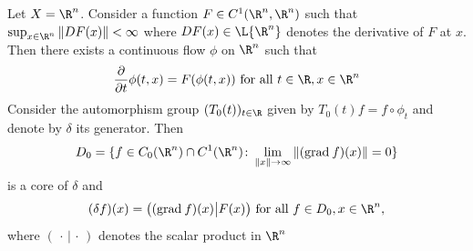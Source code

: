 \begin{example}\label{ex:b2-3.15}
Let $X = \R^{n}$.
Consider a function $F \in C^{1}(\R^{n},\R^{n})$ such that $\sup_{x \in \R^{n}} \|DF(x)\| < \infty$ where $DF(x) \in \L{\R^{n}}$ denotes the derivative of\/ $F$ at $x$.
Then there exists a continuous flow $\phi$ on $\R^{n}$ such that
\begin{equation}\label{eq:b2-3.20}
\frac{\partial}{\partial t} \phi(t,x) = F(\phi(t,x)) \text{ for all } t \in \R, x \in \R^{n}
\end{equation}
Consider the automorphism group $(T_{0}(t))_{t \in \R}$ given by $T_{0}(t)f = f \circ \phi_{t}$
and denote by $\delta$ its generator.
Then 
\[D_{0} = \{ f \in C_{0}(\R^{n}) \cap C^{1}(\R^{n}) \colon \lim_{\|x\| \to \infty} \|(\mathrm{grad}\: f)(x)\| = 0 \}
\]
is a core of\/ $\delta$ and
\begin{equation}\label{eq:b2-3.21}
(\delta f)(x) = \big((\mathrm{grad}\: f)(x) \big| F(x)\big) \text{ for all } f \in D_{0}, x \in \R^{n},
\end{equation}
where $(\,\cdot\,|\,\cdot\,)$
denotes the scalar product in $\R^{n}$
\end{example}
